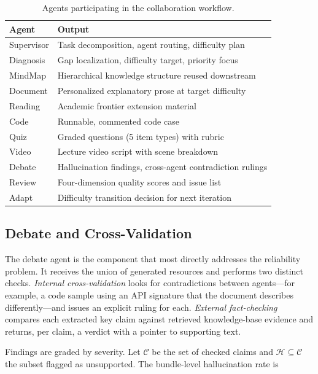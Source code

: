 \begin{table}[!t]
\centering
\caption{Agents participating in the collaboration workflow.}
\label{tab:agents}
\begin{tabular}{@{}ll@{}}
\toprule
\textbf{Agent} & \textbf{Output} \\
\midrule
Supervisor & Task decomposition, agent routing, difficulty plan \\
Diagnosis & Gap localization, difficulty target, priority focus \\
MindMap & Hierarchical knowledge structure reused downstream \\
Document & Personalized explanatory prose at target difficulty \\
Reading & Academic frontier extension material \\
Code & Runnable, commented code case \\
Quiz & Graded questions (5 item types) with rubric \\
Video & Lecture video script with scene breakdown \\
Debate & Hallucination findings, cross-agent contradiction rulings \\
Review & Four-dimension quality scores and issue list \\
Adapt & Difficulty transition decision for next iteration \\
\bottomrule
\end{tabular}
\end{table}

\subsection{Debate and Cross-Validation}
\label{ssec:debate}

The debate agent is the component that most directly addresses the reliability
problem. It receives the union of generated resources and performs two
distinct checks. \emph{Internal cross-validation} looks for contradictions
between agents---for example, a code sample using an API signature that the
document describes differently---and issues an explicit ruling for each.
\emph{External fact-checking} compares each extracted key claim against
retrieved knowledge-base evidence and returns, per claim, a verdict with a
pointer to supporting text.

Findings are graded by severity. Let $\mathcal{C}$ be the set of checked
claims and $\mathcal{H} \subseteq \mathcal{C}$ the subset flagged as
unsupported. The bundle-level hallucination rate is

